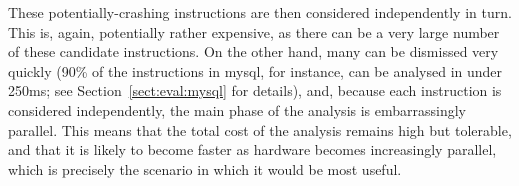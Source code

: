 These potentially-crashing instructions are then considered
independently in turn.  This is, again, potentially rather expensive,
as there can be a very large number of these candidate instructions.
On the other hand, many can be dismissed very quickly (90\% of the
instructions in mysql, for instance, can be analysed in under 250ms;
see Section~\ref{sect:eval:mysql} for details), and, because each
instruction is considered independently, the main phase of the
analysis is embarrassingly parallel.  This means that the total cost
of the analysis remains high but tolerable, and that it is likely to
become faster as hardware becomes increasingly parallel, which is
precisely the scenario in which it would be most useful.

